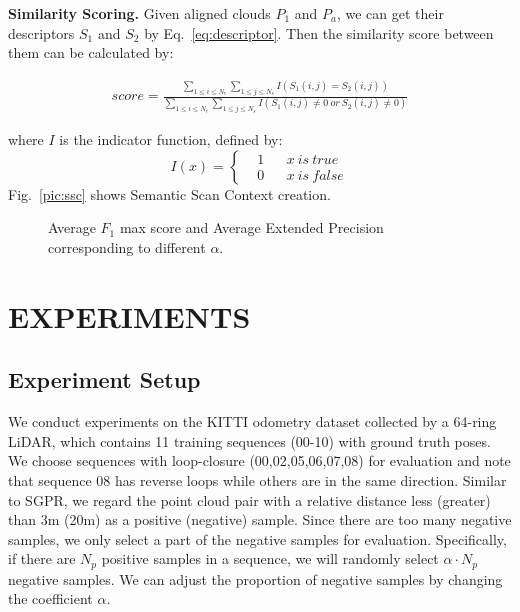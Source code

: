 \documentclass[letterpaper, 10 pt, conference]{ieeeconf}
\begin{document}
\smallskip\noindent\textbf{Similarity Scoring.} Given aligned clouds \(P_1\) and \(P_{a}\), we can get their descriptors \(S_1\) and \(S_2\) by Eq.~\ref{eq:descriptor}. Then the similarity score between them can be calculated by:
\begin{small}
\begin{equation}
    \begin{aligned}
        score=\frac{\sum\limits_{ 1\leq i\leq N_r}\sum\limits_{1\leq j\leq N_s} I(S_1(i,j)=S_2(i,j))}{\sum\limits_{1\leq i\leq N_r}\sum\limits_{1\leq j\leq N_s} I(S_1(i,j)\neq 0~or~S_2(i,j)\neq 0)}
    \end{aligned}
\end{equation}
\end{small}
where \(I\) is the indicator function, defined by:
\begin{equation}
    I(x)=\left\{
    \begin{aligned}
        &1& & x~is~true\\
        &0& & x~is~false 
    \end{aligned}
    \right.
\end{equation}
Fig.~\ref{pic:ssc} shows Semantic Scan Context creation. 



    \begin{figure*}[htb]
        \centering
            \vspace{-3mm}
        \caption{Average \(F_1\) max score and Average Extended Precision corresponding to different \(\alpha\).}
        \label{pic:F1}
     \end{figure*}

\section{EXPERIMENTS}


\subsection{Experiment Setup}\label{exp:setup}
We conduct experiments on the KITTI odometry dataset\cite{kitti} collected by a 64-ring LiDAR, which contains 11 training sequences (00-10) with ground truth poses. We choose sequences with loop-closure (00,02,05,06,07,08) for evaluation and note that sequence 08 has reverse loops while others are in the same direction. Similar to SGPR\cite{SGPR}, we regard the point cloud pair with a relative distance less (greater) than 3m (20m) as a positive (negative) sample. Since there are too many negative samples, we only select a part of the negative samples for evaluation. Specifically, if there are \(N_{p}\) positive samples in a sequence, we will randomly select \(\alpha \cdot N_{p}\) negative samples. We can adjust the proportion of negative samples by changing the coefficient \(\alpha\).
\end{document}
